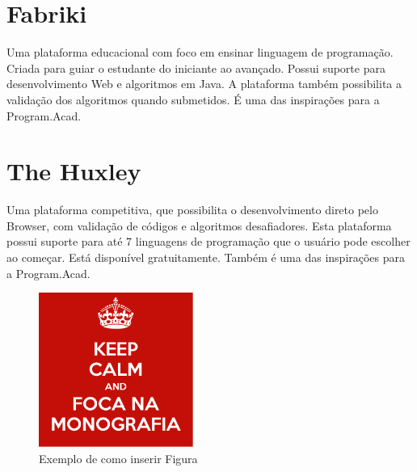 \section{Fabriki}
\label{sec:fabriki}
Uma plataforma educacional com foco em ensinar linguagem de programação. Criada para guiar o estudante do iniciante ao avançado. Possui suporte para desenvolvimento Web e algoritmos em Java. A plataforma também possibilita a validação dos algoritmos quando submetidos. É uma das inspirações para a Program.Acad.

\section{The Huxley}
\label{sec:thehuxley}
Uma plataforma competitiva, que possibilita o desenvolvimento direto pelo Browser, com validação de códigos e algoritmos desafiadores. Esta plataforma possui suporte para  até 7 linguagens de programação que o usuário pode escolher ao começar. Está disponível gratuitamente. Também é uma das inspirações para a Program.Acad.


\begin{figure}[htb]
    \centering
    \includegraphics[width=0.45\textwidth]{images/figura.png}
    \caption{Exemplo de como inserir Figura}
    \label{fig:exemplo}
\end{figure}

